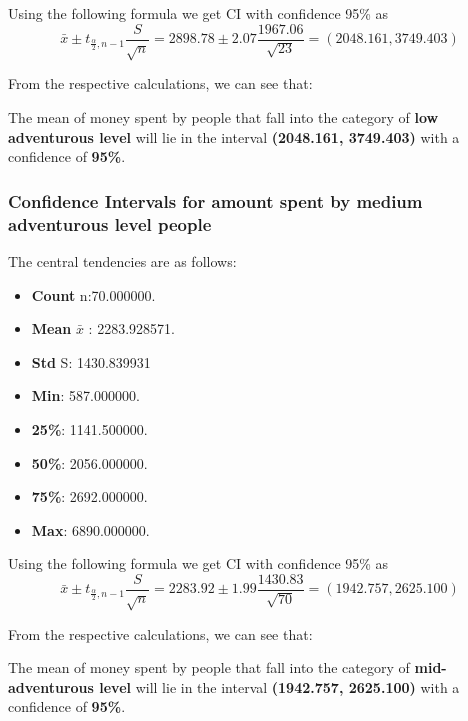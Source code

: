 \documentclass[12pt]{article}
\begin{document}
         Using the following formula we get CI with confidence 95\% as
        \begin{equation}
        \bar{x} \pm t_{\frac{\alpha}{2}, n-1} \frac{S}{\sqrt{n}} =
        2898.78 \pm 2.07 \frac{1967.06}{\sqrt{23}}  = (2048.161,3749.403)
        \end{equation}

        From the respective calculations, we can see that:
        
        \item The mean of money spent by people that fall into the category of \textbf{low adventurous level} will lie in the interval \textbf{(2048.161, 3749.403)} with a confidence of \textbf{95\%}.
        
    \subsubsection{Confidence Intervals for amount spent by medium adventurous level people}
        The central tendencies are as follows:
        \begin{itemize}
            \item \textbf{Count} n:70.000000.
            \item \textbf{Mean} $\bar{x}$ : 2283.928571.
            \item \textbf{Std} S: 1430.839931
            \item \textbf{Min}: 587.000000.
            \item \textbf{25\%}: 1141.500000.
            \item \textbf{50\%}: 2056.000000.
            \item \textbf{75\%}: 2692.000000.
            \item \textbf{Max}: 6890.000000.
        \end{itemize}

        Using the following formula we get CI with confidence 95\% as
        \begin{equation}
        \bar{x} \pm t_{\frac{\alpha}{2}, n-1} \frac{S}{\sqrt{n}} =
        2283.92 \pm 1.99 \frac{1430.83}{\sqrt{70}} = (1942.757,2625.100)
        \end{equation}

        From the respective calculations, we can see that:
        \item The mean of money spent by people that fall into the category of \textbf{mid-adventurous level} will lie in the interval \textbf{(1942.757, 2625.100)} with a confidence of \textbf{95\%}.
    
\end{document}
